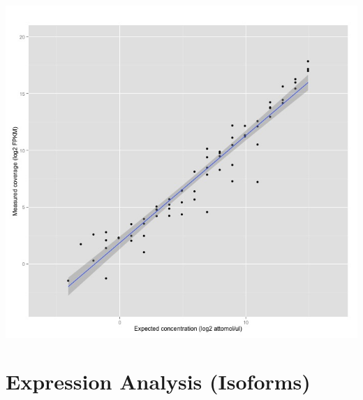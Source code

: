 \documentclass[]{article}
\begin{document}
\includegraphics{1.jpeg}

\pagebreak

\section{Expression Analysis
(Isoforms)}\label{expression-analysis-isoforms}
\end{document}
